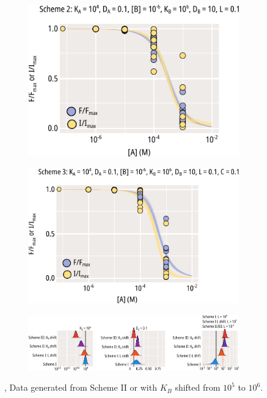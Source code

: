 \begin{figure}[h]
	\centering
	\begin{subfigure}[t]{0.45\textwidth}
		\caption{}\label{chxfig:scheme_2_kb_shift}
		\centering
		\includegraphics[width=\textwidth]{mwc_scheme_2_kb_shift.pdf}
	\end{subfigure}
	\hfill
	\begin{subfigure}[t]{0.45\textwidth}
		\caption{}\label{chxfig:scheme_3_kb_shift}
		\centering
		\includegraphics[width=\textwidth]{mwc_scheme_3_kb_shift.pdf}
	\end{subfigure}
	\vfill
	\begin{subfigure}[t]{0.9\textwidth}
		\caption{}\label{chxfig:mwc_params_3}
		\centering
		\includegraphics[width=\textwidth]{mwc_scheme_param_fits_3.pdf}
	\end{subfigure}
	\caption[Parameter retrieval from MWC models]{
	,  Data generated from  Scheme II  or  with $K_B$ shifted from $10^5$ to $10^6$.
	}\label{chxfig:scheme_2_3_shifts}
\end{figure}

